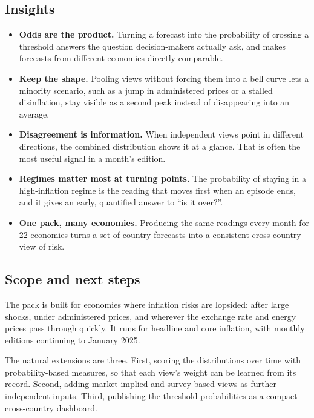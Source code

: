 \documentclass[
  british,
  a4paper,
]{article}
\providecommand{\tightlist}{%
  \setlength{\itemsep}{0pt}\setlength{\parskip}{0pt}}
\begin{document}
\subsection{Insights}\label{insights}

\begin{itemize}
\tightlist
\item
  \textbf{Odds are the product.} Turning a forecast into the probability
  of crossing a threshold answers the question decision-makers actually
  ask, and makes forecasts from different economies directly comparable.
\item
  \textbf{Keep the shape.} Pooling views without forcing them into a
  bell curve lets a minority scenario, such as a jump in administered
  prices or a stalled disinflation, stay visible as a second peak
  instead of disappearing into an average.
\item
  \textbf{Disagreement is information.} When independent views point in
  different directions, the combined distribution shows it at a glance.
  That is often the most useful signal in a month's edition.
\item
  \textbf{Regimes matter most at turning points.} The probability of
  staying in a high-inflation regime is the reading that moves first
  when an episode ends, and it gives an early, quantified answer to ``is
  it over?''.
\item
  \textbf{One pack, many economies.} Producing the same readings every
  month for 22 economies turns a set of country forecasts into a
  consistent cross-country view of risk.
\end{itemize}

\subsection{Scope and next steps}\label{scope-and-next-steps}

The pack is built for economies where inflation risks are lopsided:
after large shocks, under administered prices, and wherever the exchange
rate and energy prices pass through quickly. It runs for headline and
core inflation, with monthly editions continuing to January 2025.

The natural extensions are three. First, scoring the distributions over
time with probability-based measures, so that each view's weight can be
learned from its record. Second, adding market-implied and survey-based
views as further independent inputs. Third, publishing the threshold
probabilities as a compact cross-country dashboard.
\end{document}
